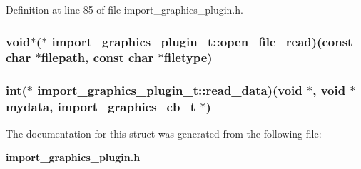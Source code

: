 Definition at line 85 of file import\_\-graphics\_\-plugin.h.
\subsubsection{\setlength{\rightskip}{0pt plus 5cm}void$\ast$($\ast$  import\_\-graphics\_\-plugin\_\-t::open\_\-file\_\-read)(const char $\ast$filepath, const char $\ast${\bf filetype})}\label{structimport__graphics__plugin__t_m1}


\subsubsection{\setlength{\rightskip}{0pt plus 5cm}int($\ast$  import\_\-graphics\_\-plugin\_\-t::read\_\-data)(void $\ast$, void $\ast$mydata, {\bf import\_\-graphics\_\-cb\_\-t} $\ast$)}\label{structimport__graphics__plugin__t_m2}




The documentation for this struct was generated from the following file:\begin{CompactItemize}
\item 
{\bf import\_\-graphics\_\-plugin.h}\end{CompactItemize}

